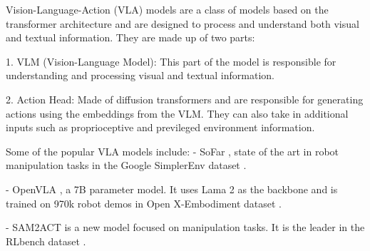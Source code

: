 Vision-Language-Action (VLA) models are a class of models based on the transformer architecture and are designed to process and understand both visual and textual information. They are made up of two parts: 

1. VLM (Vision-Language Model): This part of the model is responsible for understanding and processing visual and textual information. 

2. Action Head: Made of diffusion transformers and are responsible for generating actions using the embeddings from the VLM. They can also take in additional inputs such as proprioceptive and previleged environment information.

Some of the popular VLA models include:
- SoFar \cite{qiSoFarLanguageGroundedOrientation2025}, state of the art in robot manipulation tasks in the Google SimplerEnv dataset \cite{liEvaluatingRealWorldRobot2024}.

- OpenVLA \cite{kimOpenVLAOpenSourceVisionLanguageAction2024}, a 7B parameter model. It uses Lama 2 as the backbone and is trained on 970k robot demos in Open X-Embodiment dataset \cite{collaborationOpenXEmbodimentRobotic2024}.

- SAM2ACT \cite{fangSAM2ActIntegratingVisual2025} is a new model focused on manipulation tasks. It is the leader in the RLbench dataset \cite{jamesRLBenchRobotLearning2019a}. 
